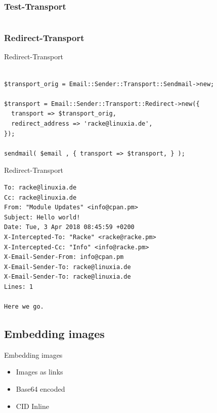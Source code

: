 \subsubsection{Test-Transport}

\begin{verbatim}

\end{verbatim}

\subsubsection{Redirect-Transport}

\begin{frame}[fragile]{Redirect-Transport}
  \begin{verbatim}

$transport_orig = Email::Sender::Transport::Sendmail->new;

$transport = Email::Sender::Transport::Redirect->new({
  transport => $transport_orig,
  redirect_address => 'racke@linuxia.de',
});

sendmail( $email , { transport => $transport, } );

\end{verbatim}
\end{frame}

\begin{frame}[fragile]{Redirect-Transport}
\begin{lstlisting}
To: racke@linuxia.de
Cc: racke@linuxia.de
From: "Module Updates" <info@cpan.pm>
Subject: Hello world!
Date: Tue, 3 Apr 2018 08:45:59 +0200
X-Intercepted-To: "Racke" <racke@racke.pm>
X-Intercepted-Cc: "Info" <info@racke.pm>
X-Email-Sender-From: info@cpan.pm
X-Email-Sender-To: racke@linuxia.de
X-Email-Sender-To: racke@linuxia.de
Lines: 1

Here we go.
\end{lstlisting}
\end{frame}

\subsection{Embedding images}

\begin{frame}{Embedding images}
  \begin{itemize}
  \item Images as links
  \item Base64 encoded
  \item CID Inline
  \end{itemize}
\end{frame}


